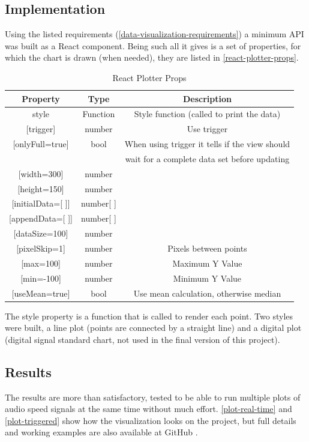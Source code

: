 \subsection{Implementation}
Using the listed requirements (\autoref{data-visualization-requirements}) a minimum
API was built as a React component. Being such all it gives is a set of properties,
for which the chart is drawn (when needed), they are listed in \autoref{react-plotter-props}.
\begin{table}[htb]
  \ABNTEXreducedfont
  \caption[React Plotter Props]{React Plotter Props}
  \label{react-plotter-props}
  \centering
  \begin{tabular}{c|c|c}
    \textbf{Property} & \textbf{Type} & \textbf{Description} \\
    \hline \hline
    style &	Function & Style function (called to print the data) \\
    \hline
    {[trigger]} &	number & Use trigger \\
    \hline
    {[onlyFull=true]}	& bool & When using trigger it tells if the view should \\
                      &      & wait for a complete data set before updating \\
    \hline
    {[width=300]} &	number \\
    \hline
    {[height=150]} & number \\
    \hline
    {[initialData=[ ]]} & number{[ ]} \\
    \hline
    {[appendData=[ ]]} & number{[ ]} \\
    \hline
    {[dataSize=100]} & number \\
    \hline
    {[pixelSkip=1]} &	number &	Pixels between points \\
    \hline
    {[max=100]} &	number & Maximum Y Value \\
    \hline
    {[min=-100]} & number & Minimum Y Value \\
    \hline
    {[useMean=true]} & bool & Use mean calculation, otherwise median  \\
  \end{tabular}
\end{table}
The style property is a function that is called to render each point. Two styles
were built, a line plot (points are connected by a straight line) and a digital
plot (digital signal standard chart, not used in the final version of this project).

\subsection{Results}
The results are more than satisfactory, tested to be able to run multiple plots
of audio speed signals at the same time without much effort. \autoref{plot-real-time}
and \autoref{plot-triggered} show how the visualization looks on the
project, but full details and working examples are also available at GitHub
\cite{react-plotter}.

